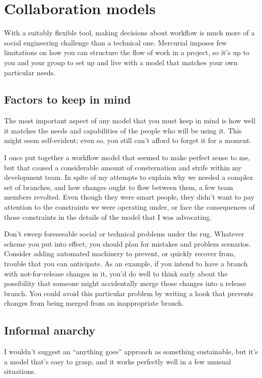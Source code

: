 \section{Collaboration models}

With a suitably flexible tool, making decisions about workflow is much
more of a social engineering challenge than a technical one.
Mercurial imposes few limitations on how you can structure the flow of
work in a project, so it's up to you and your group to set up and live
with a model that matches your own particular needs.

\subsection{Factors to keep in mind}

The most important aspect of any model that you must keep in mind is
how well it matches the needs and capabilities of the people who will
be using it.  This might seem self-evident; even so, you still can't
afford to forget it for a moment.

I once put together a workflow model that seemed to make perfect sense
to me, but that caused a considerable amount of consternation and
strife within my development team.  In spite of my attempts to explain
why we needed a complex set of branches, and how changes ought to flow
between them, a few team members revolted.  Even though they were
smart people, they didn't want to pay attention to the constraints we
were operating under, or face the consequences of those constraints in
the details of the model that I was advocating.

Don't sweep foreseeable social or technical problems under the rug.
Whatever scheme you put into effect, you should plan for mistakes and
problem scenarios.  Consider adding automated machinery to prevent, or
quickly recover from, trouble that you can anticipate.  As an example,
if you intend to have a branch with not-for-release changes in it,
you'd do well to think early about the possibility that someone might
accidentally merge those changes into a release branch.  You could
avoid this particular problem by writing a hook that prevents changes
from being merged from an inappropriate branch.

\subsection{Informal anarchy}

I wouldn't suggest an ``anything goes'' approach as something
sustainable, but it's a model that's easy to grasp, and it works
perfectly well in a few unusual situations.

